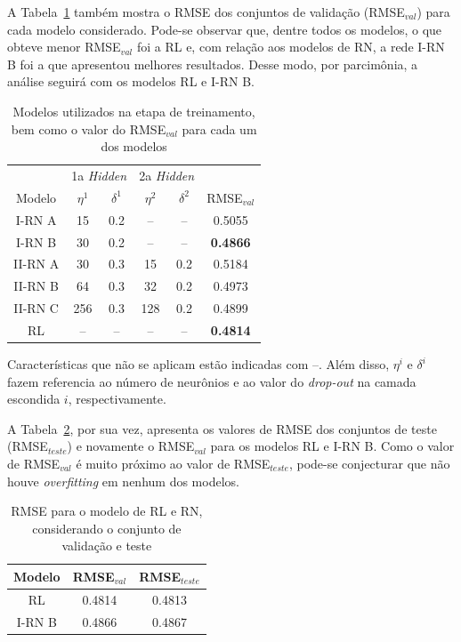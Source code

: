 \documentclass[runningheads,a4paper]{llncs}
\begin{document}
A Tabela~\ref{tab:2} também mostra o RMSE dos conjuntos de validação (RMSE$_{val}$) para cada modelo considerado. Pode-se observar que, dentre todos os modelos, o que obteve menor RMSE$_{val}$ foi a RL e, com relação aos modelos de RN, a rede I-RN B foi a que apresentou melhores resultados. Desse modo, por parcimônia, a análise seguirá com os modelos RL e I-RN B.

\begin{table}[ht]
	\centering
	\caption{Modelos utilizados na etapa de treinamento, bem como o valor do RMSE$_{val}$ para cada um dos modelos}
	\label{tab:2}
	\begin{tabular}{cccccc}
		\toprule
		& \multicolumn{2}{c}{1a \textit{Hidden}} & \multicolumn{2}{c}{2a \textit{Hidden}} & \\
		\cmidrule(lr){2-3} \cmidrule(lr){4-5}
		Modelo & $\eta^1$ & $\delta^1$ & $\eta^2$ & $\delta^2$ & RMSE$_{val}$\\ 
		\midrule
		I-RN A & 15 & 0.2 & -- & -- & 0.5055\\ 
		I-RN  B & 30 & 0.2 & -- & -- & \textbf{0.4866}\\ 
		II-RN A & 30 & 0.3 & 15 & 0.2 & 0.5184\\
		II-RN B & 64 & 0.3 & 32 & 0.2 & 0.4973\\
		II-RN C & 256 & 0.3 & 128 & 0.2 & 0.4899\\
		\midrule
		RL & -- & -- & -- & -- & \textbf{0.4814}\\
		\bottomrule
	\end{tabular}
	\begin{tablenotes}\footnotesize
			\item{Características que não se aplicam estão indicadas com --. Além disso, $\eta^i$ e $\delta^i$ fazem referencia ao número de neurônios e ao valor do \textit{drop-out} na camada escondida $i$, respectivamente.}
	\end{tablenotes}
\end{table}

A Tabela~\ref{tab:3}, por sua vez, apresenta os valores de RMSE dos conjuntos de teste (RMSE$_{teste}$) e novamente o RMSE$_{val}$ para os modelos RL e I-RN B. Como o valor de RMSE$_{val}$ é muito próximo ao valor de RMSE$_{teste}$, pode-se conjecturar que não houve \textit{overfitting} em nenhum dos modelos.

\begin{table}[ht]
	\centering
	\caption{RMSE para o modelo de RL e RN, considerando o conjunto de validação e teste}
	\label{tab:3}
	\begin{tabular}{ccc}
		\toprule
		Modelo & RMSE$_{val}$ & RMSE$_{teste}$ \\ 
		\midrule
		RL & 0.4814 & 0.4813 \\ 
		I-RN B & 0.4866 & 0.4867 \\ 
		\bottomrule
	\end{tabular}
\end{table}
\end{document}
